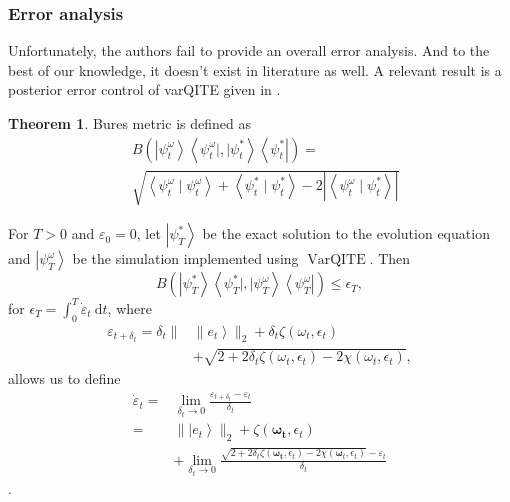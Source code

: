\documentclass[11pt]{article}
\theoremstyle{definition}
\newtheorem{theorem}{Theorem}[section]
\begin{document}
\subsubsection{Error analysis}
Unfortunately, the authors fail to provide an overall error analysis. And to the best of our knowledge, it doesn't exist in literature as well. A relevant result is a  posterior error control of varQITE given in \cite{zoufal_error_2021}. \\
\begin{theorem}
    Bures metric is defined as
$$
\begin{aligned}
& B\left(\left|\psi_t^\omega\right\rangle\left\langle\psi_t^\omega|,| \psi_t^*\right\rangle\left\langle\psi_t^*\right|\right)= \\
& \sqrt{\left\langle\psi_t^\omega \mid \psi_t^\omega\right\rangle+\left\langle\psi_t^* \mid \psi_t^*\right\rangle-2\left|\left\langle\psi_t^\omega \mid \psi_t^*\right\rangle\right|}
\end{aligned}
$$

 For $T>0$ and $\varepsilon_0=0$, let $\left|\psi_T^*\right\rangle$ be the exact solution to the evolution equation and $\left|\psi_T^\omega\right\rangle$ be the simulation implemented using $\operatorname{VarQITE}$. Then
$$
B\left(\left|\psi_T^*\right\rangle\left\langle\psi_T^*|,| \psi_T^\omega\right\rangle\left\langle\psi_T^\omega\right|\right) \leq \epsilon_T,
$$
for $\epsilon_T=\int_0^T \dot{\varepsilon}_t \mathrm{~d} t$, where
$$
\begin{aligned}
\varepsilon_{t+\delta_t}=\delta_t \| & \left.\| e_t\right\rangle \|_2+\delta_t \zeta\left(\omega_t, \epsilon_t\right) \\
& +\sqrt{2+2 \delta_t \zeta\left(\omega_t, \epsilon_t\right)-2 \chi\left(\omega_t, \epsilon_t\right)},
\end{aligned}
$$
allows us to define
$$
\begin{aligned}
\dot{\varepsilon}_t= & \lim _{\delta_t \rightarrow 0} \frac{\varepsilon_{t+\delta_t}-\varepsilon_t}{\delta_t} \\
= & \|\left|e_t\right\rangle \|_2+\zeta\left(\boldsymbol{\omega}_{\boldsymbol{t}}, \epsilon_t\right) \\
& +\lim _{\delta_t \rightarrow 0} \frac{\sqrt{2+2 \delta_t \zeta\left(\boldsymbol{\omega}_{\boldsymbol{t}}, \epsilon_t\right)-2 \chi\left(\boldsymbol{\omega}_t, \epsilon_t\right)}-\varepsilon_t}{\delta_t}
\end{aligned}
$$.
\end{theorem}
\end{document}
